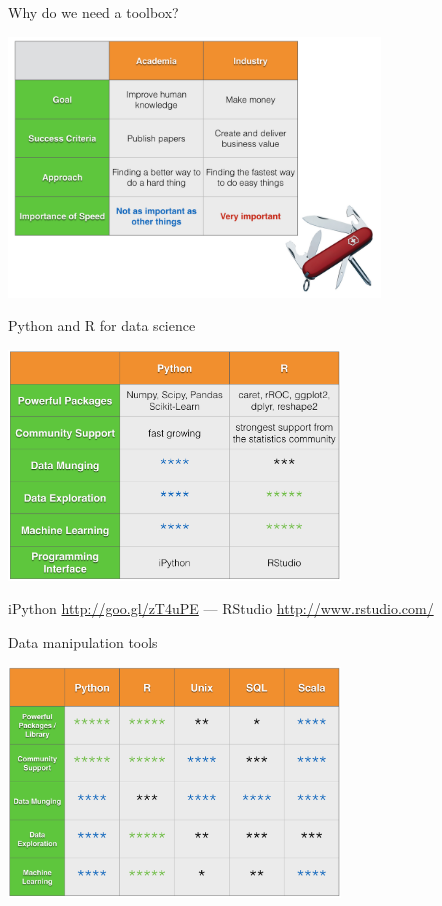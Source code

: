 \documentclass[10pt]{beamer}
\begin{document}
    \begin{frame}{Why do we need a toolbox?}
      \begin{center}
        \includegraphics[width=280pt]{../graphs/industry_swiss_army_knife}
      \end{center}
    \end{frame}
    
    \begin{frame}{Python and R for data science}
      \begin{center}
        \includegraphics[width=250pt]{../graphs/python_r}
      \end{center}
      {\footnotesize
        iPython \url{http://goo.gl/zT4uPE}
        --- 
        RStudio \url{http://www.rstudio.com/}
      }
    \end{frame}

    \begin{frame}{Data manipulation tools}
      \begin{center}
         \includegraphics[width=250pt]{../graphs/data_tools}
      \end{center}
    \end{frame}
\end{document}
